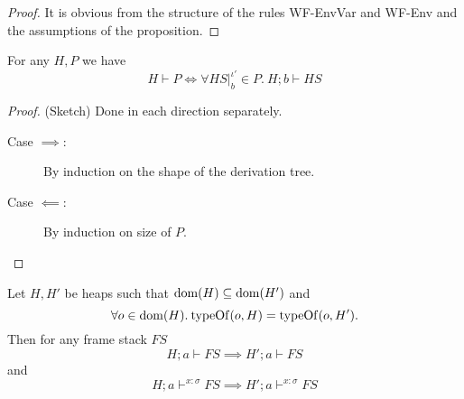 \begin{proof}
  It is obvious from the structure of the rules {\sc WF-EnvVar} and {\sc
  WF-Env} and the assumptions of the proposition.
\end{proof}

\begin{proposition} \label{prop:2.13}
  For any $H, P$ we have 
  \begin{equation}
    H \vdash P \iff \forall HS|_b^{\iota'} \in P.\: H;b \vdash HS
  \end{equation}
\end{proposition}

\begin{proof} (Sketch) Done in each direction separately.
  \begin{description}
    \item[Case $\implies$:] By induction on the shape of the derivation tree.
    \item[Case $\impliedby$:] By induction on size of $P$.
  \end{description}
\end{proof}

\begin{proposition} \label{prop:2.14}
  Let $H, H'$ be heaps such that $\mbox{$\mathrm{dom}$}{(H)} \subseteq \mbox{$\mathrm{dom}$}{(H')}$ and 
  \begin{equation*}
    \forall o \in \mbox{$\mathrm{dom}$}{(H)}. \: \mbox{$\mathrm{typeOf}$}{(o, H)} = \mbox{$\mathrm{typeOf}$}{(o, H')}.
  \end{equation*}
  Then for any frame stack $FS$
  \begin{equation}\label{eq:fs_impl_typing1}
    H; a \vdash FS \implies H'; a \vdash FS
  \end{equation}
  and
  \begin{equation} \label{eq:fs_impl_typing2}
    H; a \vdash^{x :\sigma} FS \implies H'; a \vdash^{x: \sigma} FS 
  \end{equation}
\end{proposition}

